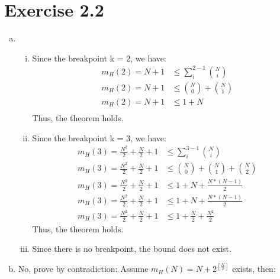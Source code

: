 \documentclass{article}
\def\math#1{$#1$}
\begin{document}
\section{Exercise 2.2}

\begin{enumerate}[a)]
    \item 
        \begin{enumerate}[i)]
            \item Since the breakpoint k = 2, we have: 
                \begin{equation}
                    \begin{split}
                        m_H(2) = N + 1 &\leq \sum^{2 - 1}_i{N \choose i} \\
                        m_H(2) = N + 1 &\leq {N \choose 0} + {N \choose 1} \\
                        m_H(2) = N + 1 &\leq 1 + N \\
                    \end{split}
                \end{equation}
                Thus, the theorem holds.
            \item Since the breakpoint k = 3, we have: 
                \begin{equation}
                    \begin{split}
                         m_H(3) = \frac{N^2}{2} + \frac{N}{2} + 1 &\leq \sum^{3 - 1}_i{N \choose i} \\
                         m_H(3) = \frac{N^2}{2} + \frac{N}{2} + 1 &\leq {N \choose 0} + {N \choose 1} + {N \choose 2} \\
                         m_H(3) = \frac{N^2}{2} + \frac{N}{2} + 1 &\leq 1 + N + \frac{N * (N - 1)}{2} \\
                         m_H(3) = \frac{N^2}{2} + \frac{N}{2} + 1 &\leq 1 + N + \frac{N * (N - 1)}{2} \\
                         m_H(3) = \frac{N^2}{2} + \frac{N}{2} + 1 &\leq 1 +  \frac{N}{2} + \frac{N^2}{2} 
                    \end{split}
                \end{equation}
                Thus, the theorem holds.
            \item Since there is no breakpoint, the bound does not exist. 
        \end{enumerate}
    \item No, prove by contradiction:
        Assume \math{m_H(N) = N + 2^{[\frac{N}{2}]}} exists, then:

\end{enumerate}
\end{document}
